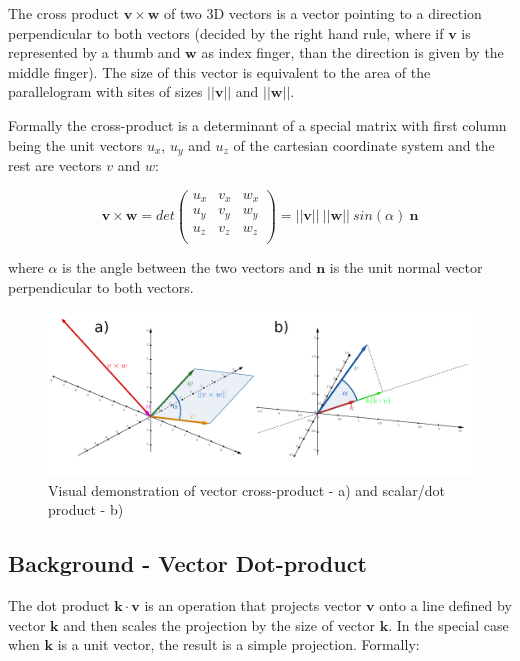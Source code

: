 The cross product $\bm{v} \times \bm{w}$ of two 3D vectors is a vector pointing to a direction perpendicular to both vectors (decided by the right hand rule, where if $\bm{v}$  is represented by a thumb and $\bm{w}$ as index finger, than the direction is given by the middle finger). The size of this vector is equivalent to the area of the parallelogram with sites of sizes $||\bm{v}||$ and $||\bm{w}||$.

Formally the cross-product is a determinant of a special matrix with first column being the unit vectors $u_x$, $u_y$ and $u_z$ of the cartesian coordinate system and the rest are vectors $v$ and $w$:

$$\bm{v} \times \bm{w} = det
\left(
\begin{array}{ccc}
    u_x & v_{x} & w_{x}\\
    u_y & v_{y} & w_{y}\\
    u_z & v_{z} & w_{z}\\
\end{array}
\right) = ||\bm{v}||~||\bm{w}||~sin(\alpha)~\bm{n}
$$

where $\alpha$ is the angle between the two vectors and $\bm{n}$ is the unit normal vector perpendicular to both vectors.

\begin{figure}
    \centering
    \includegraphics[scale=0.23]{imgs_tomas/vector_ops.png}
    \caption{Visual demonstration of vector cross-product - a) and scalar/dot product - b)}
    \label{fig:vector ops}
\end{figure}

\subsection{Background - Vector Dot-product}
The dot product $\bm{k} \cdot \bm{v}$ is an operation that projects vector $\bm{v}$ onto a line defined by vector $\bm{k}$ and then scales the projection by the size of vector $\bm{k}$. In the special case when $\bm{k}$ is a unit vector, the result is a simple projection. Formally:

